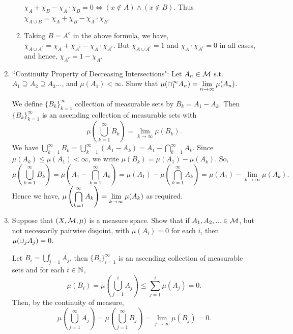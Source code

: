 \documentclass[12pt]{article}
\begin{document}
\begin{enumerate}
\begin{mybox}
\begin{enumerate}
    $\chi_A + \chi_B - \chi_A\cdot\chi_B=0\iff
    (x\notin A)\wedge (x\notin B)$. Thus
    $\chi_{A\cup B} = \chi_A + \chi_B - \chi_A\cdot\chi_B$.

    \vspace*{3mm}
    \item Taking $B=A^c$ in the above formula, we have,
    $\chi_{A\cup A^c}=\chi_A+\chi_{A^c}-\chi_A\cdot\chi_{A^c}.$
    But $\chi_{A\cup A^c}=1$ and $\chi_A\cdot\chi_{A^c}=0$ in
    all cases, and hence, $\chi_{A^c}=1-\chi_A$.
  \end{enumerate}
\end{mybox}

\item ``Continuity Property of Decreasing Intersections":
Let $A_n \in \mathcal{M}$ s.t. $A_1 \supseteq A_2 \supseteq A_3 ... $, and $\mu(A_1) < \infty$.  Show that $\displaystyle \mu(\cap_1^{\infty} A_n ) = \lim_{n \to \infty}\mu(A_n)$.  

\begin{mybox}
  We define $\{B_k\}_{k=1}^\infty$ collection of measurable
  sets by $B_k=A_1-A_k$. Then $\{B_k\}_{k=1}^\infty$ is an
  ascending collection of measurable sets with
  $$\mu\left(\bigcup_{k=1}^\infty{B_k}\right)=
  \lim_{k\to\infty}{\mu(B_k)}.$$
  We have $\bigcup_{k=1}^\infty{B_k}=\bigcup_{k=1}^\infty{
  (A_1-A_k)}=A_1-\bigcap_{k=1}^\infty{A_k}.$ Since
  $\mu(A_k)\leq\mu(A_1)<\infty$, we write $\mu(B_k)=
  \mu(A_1)-\mu(A_k)$. So,
  $$\mu\left(\bigcup_{k=1}^\infty{B_k}\right)=
  \mu\left(A_1-\bigcap_{k=1}^\infty{A_k}\right)
  =\mu(A_1)-\mu\left(\bigcap_{k=1}^\infty{A_k}\right)
  =\mu(A_1)-\lim_{k\to\infty}{\mu(A_k)}.$$
  Hence we have, $\displaystyle\mu\left(\bigcap_{k=1}^\infty{A_k}\right)
  =\lim_{k\to\infty}{\mu(A_k)}$ as required.
\end{mybox}

\item  Suppose that $(X, \mathcal{M}, \mu)$ is a measure space. Show that if $A_1, A_2, ... \in \mathcal{M}$, but not necessarily pairwise disjoint, with $\mu(A_i) = 0$ for each $i$, then $\displaystyle \mu(\cup_j A_j) = 0$.

\begin{mybox}
  Let $B_i=\bigcup_{j=1}^i{A_j}$, then $\{B_i\}_{i=1}^\infty$
  is an ascending collection of measurable sets and for
  each $i\in\mathbb{N}$,
  $$\mu(B_i)= \mu\left(\bigcup_{j=1}^i{A_j}\right)
  \leq\sum_{j=1}^i{\mu(A_j)}=0.$$
  Then, by the continuity of measure,
  $$\mu\left(\bigcup_{j=1}^\infty{A_j}\right)
  =\mu\left(\bigcup_{j=1}^\infty{B_j}\right)
  =\lim_{j\to\infty}{\mu(B_j)}=0.$$
\end{mybox}


\end{enumerate}
\end{document}
